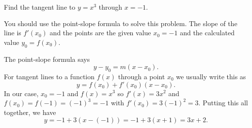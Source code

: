 \documentclass{ximera}
\author{Emma Smith Zbarsky}
\begin{document}
\begin{exercise}

Find the tangent line to $y = x^3$ through $x=-1$.


\begin{hint}
You should use the point-slope formula to solve this problem. The slope
of the line is $f'(x_0)$ and the points are the given value $x_0=-1$ and
the calculated value $y_0 = f(x_0)$.
\end{hint}


\begin{hint}
The point-slope formula says \[y-y_0 = m(x-x_0).\] For tangent lines to
a function $f(x)$ through a point $x_0$ we usually write this as
\[y = f(x_0)+f'(x_0)(x-x_0).\] In our case, $x_0 = -1$ and $f(x) = x^3$
so $f'(x) = 3x^2$ and $f(x_0) = f(-1) = (-1)^3 = -1$ with
$f'(x_0) = 3(-1)^2 = 3$. Putting this all together, we have
\[y = -1 + 3(x-(-1)) = -1+3(x+1) = 3x+2.\]
\end{hint}


\begin{multipleChoice}
\end{multipleChoice}

\end{exercise}
\end{document}
